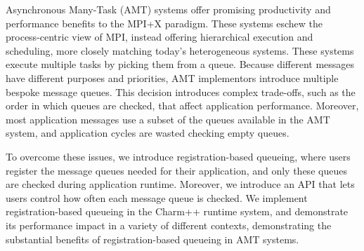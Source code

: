 Asynchronous Many-Task (AMT) systems offer promising productivity and performance benefits to the MPI+X paradigm. These systems eschew the process-centric view of MPI, instead offering hierarchical execution and scheduling, more closely matching today's heterogeneous systems. These systems execute multiple tasks by picking them from a queue. Because different messages have different purposes and priorities, AMT implementors introduce multiple bespoke message queues. This decision introduces complex trade-offs, such as the order in which queues are checked, that affect application performance. Moreover, most application messages use a subset of the queues available in the AMT system, and application cycles are wasted checking empty queues.

To overcome these issues, we introduce registration-based queueing, where users register the message queues needed for their application, and only these queues are checked during application runtime. Moreover, we introduce an API that lets users control how often each message queue is checked. We implement registration-based queueing in the Charm++ runtime system, and demonstrate its performance impact in a variety of different contexts, demonstrating the substantial benefits of registration-based queueing in AMT systems.
